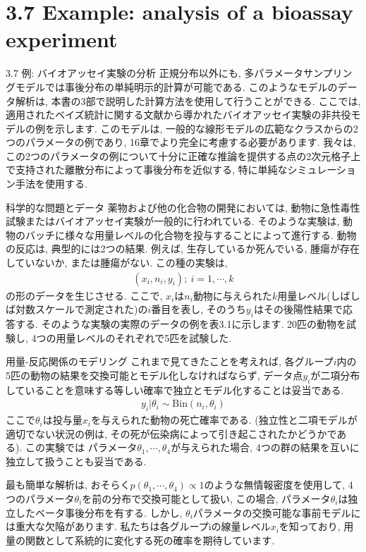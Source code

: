 \documentclass[10pt,dvipdfmx,a4]{beamer}
\newcommand{\eqn}[1]{\begin{align*}#1\end{align*}}
\begin{document}
\section{3.7 Example: analysis of a bioassay experiment}
\begin{frame}{3.7 例: バイオアッセイ実験の分析}
正規分布以外にも, 多パラメータサンプリングモデルでは事後分布の単純明示的計算が可能である.
このようなモデルのデータ解析は, 本書の3部で説明した計算方法を使用して行うことができる.
ここでは, 適用されたベイズ統計に関する文献から導かれたバイオアッセイ実験の非共役モデルの例を示します.
このモデルは, 一般的な線形モデルの広範なクラスからの2つのパラメータの例であり, 16章でより完全に考慮する必要があります.
我々は, この2つのパラメータの例について十分に正確な推論を提供する点の2次元格子上で支持された離散分布によって事後分布を近似する, 特に単純なシミュレーション手法を使用する.
\end{frame}


\begin{frame}{科学的な問題とデータ}
薬物および他の化合物の開発においては, 動物に急性毒性試験またはバイオアッセイ実験が一般的に行われている.
そのような実験は, 動物のバッチに様々な用量レベルの化合物を投与することによって進行する.
動物の反応は, 典型的には2つの結果.
例えば, 生存しているか死んでいる, 腫瘍が存在していないか, または腫瘍がない.
この種の実験は,
\eqn{(x_i,n_i,y_i);\ i=1,\cdots,k}
の形のデータを生じさせる.
ここで, $x_i$は$n_i$動物に与えられた$k$用量レベル(しばしば対数スケールで測定された)の$i$番目を表し, そのうち$y_i$はその後陽性結果で応答する.
そのような実験の実際のデータの例を表3.1に示します.
20匹の動物を試験し, 4つの用量レベルのそれぞれで5匹を試験した.
\end{frame}


\begin{frame}{用量-反応関係のモデリング}
これまで見てきたことを考えれば, 各グループ$i$内の5匹の動物の結果を交換可能とモデル化しなければならず, データ点$y_i$が二項分布していることを意味する等しい確率で独立とモデル化することは妥当である.
\eqn{y_i|\theta_i\sim\text{Bin}(n_i,\theta_i)}
ここで$\theta_i$は投与量$x_i$を与えられた動物の死亡確率である.
(独立性と二項モデルが適切でない状況の例は, その死が伝染病によって引き起こされたかどうかである).
この実験では パラメータ$\theta_1, \cdots, \theta_4$が与えられた場合, 4つの群の結果を互いに独立して扱うことも妥当である.

最も簡単な解析は, おそらく$p(\theta_1,\cdots,\theta_4)\propto1$のような無情報密度を使用して, 4つのパラメータ$\theta_i$を前の分布で交換可能として扱い, この場合, パラメータ$\theta_i$は独立したベータ事後分布を有する.
しかし, $\theta_i$パラメータの交換可能な事前モデルには重大な欠陥があります.
私たちは各グループiの線量レベル$x_i$を知っており, 用量の関数として系統的に変化する死の確率を期待しています.
\end{frame}
\end{document}
